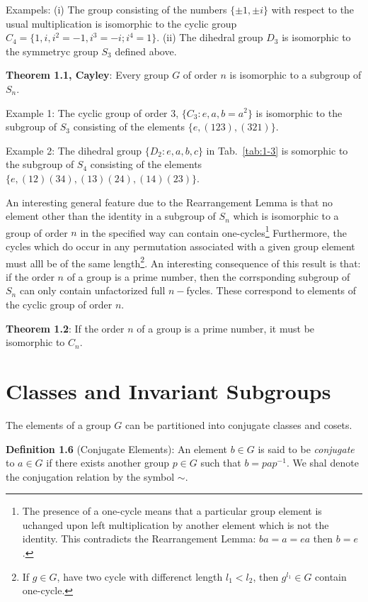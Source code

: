 \textrm{Exampels}: (i) The group consisting of the numbers $\{\pm 1, \pm i \}$ with respect to the usual multiplication is isomorphic to the cyclic group $C_{4} = \{1, i, i^{2}=-1, i^{3} = -i; i^{4} = 1\}$.
(ii) The dihedral group $D_{3}$ is isomorphic to the symmetryc group $S_{3}$ defined above.

\textbf{Theorem 1.1, Cayley}: Every group $G$ of order $n$ is isomorphic to a subgroup of $S_{n}$.

\textrm{Example 1}: The cyclic group of order $3$, $\{C_{3}: e, a, b=a^{2}\}$ is isomorphic to the subgroup of $S_{3}$ consisting of the elements $\{e, \left(123\right), \left(321\right)\}$.

\textrm{Example 2}: The dihedral group $\{ D_{2}: e, a, b, c\}$ in Tab.~\ref{tab:1-3} is somorphic to the subgroup of $S_{4}$ consisting of the elements $\{ e, \left(12\right)\left(34\right), \left(13\right)\left(24\right), \left(14\right)\left(23\right)\}$.

An interesting general feature due to the Rearrangement Lemma is that no element other than the identity in a subgroup of $S_{n}$ which is isomorphic to a group of order $n$ in the specified way can contain one-cycles\footnote{The presence of a one-cycle means that a particular group element is uchanged upon left multiplication by another element which is not the identity. This contradicts the Rearrangement Lemma: $ba = a = e a$ then $b=e$.}
Furthermore, the cycles which do occur in any permutation associated with a given group element must alll be of the same length\footnote{If $g\in G$, have two cycle with differenct length $l_{1} < l_{2}$, then $g^{l_{1}}\in G$ contain one-cycle.}.
An interesting consequence of this result is that: if the order $n$ of a group is a prime number, then the corrsponding subgroup of $S_{n}$ can only contain unfactorized full $n-$fycles.
These correspond to elements of the cyclic group of order $n$.

\textbf{Theorem 1.2}: If the order $n$ of a group is a prime number, it must be isomorphic to $C_{n}$.

\section{Classes and Invariant Subgroups}
The elements of a group $G$ can be partitioned into conjugate classes and cosets.

\textbf{Definition 1.6} (Conjugate Elements): An element $b\in G$ is said to be \textit{conjugate} to $a \in G$ if there exists another group $p \in G$ such that $ b = p a p^{-1}$. We shal denote the conjugation relation by the symbol $\sim$.

